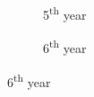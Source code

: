 \begin{figure}[ht]    \ContinuedFloat
    \begin{subfigure}{0.48\textwidth}
        \caption{5\textsuperscript{th} year} 
        \label{fig:JetUML_V3S5}
    \end{subfigure}\hspace*{\fill}
    \begin{subfigure}{0.48\textwidth}
        \caption{6\textsuperscript{th} year} 
        \label{fig:JetUML_V3S6}
    \end{subfigure}


\end{figure}
